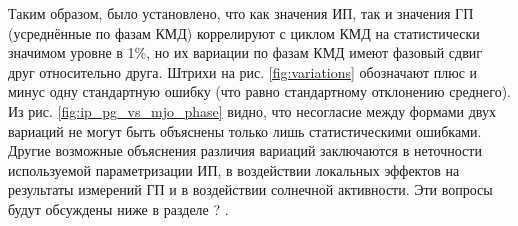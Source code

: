 Таким образом, было установлено, что как значения ИП, так и значения ГП (усреднённые по фазам КМД) коррелируют с циклом КМД на статистически значимом уровне в 1\%, но их вариации по фазам КМД имеют фазовый сдвиг друг относительно друга. Штрихи на рис. \ref{fig:variations} обозначают плюс и минус одну стандартную ошибку (что равно стандартному отклонению среднего). Из рис. \ref{fig:ip_pg_vs_mjo_phase} видно, что несогласие между формами двух вариаций не могут быть объяснены только лишь статистическими ошибками. Другие возможные объяснения различия вариаций заключаются в неточности используемой параметризации ИП, в воздействии локальных эффектов на результаты измерений ГП и в воздействии солнечной активности. Эти вопросы будут обсуждены ниже в разделе ? .